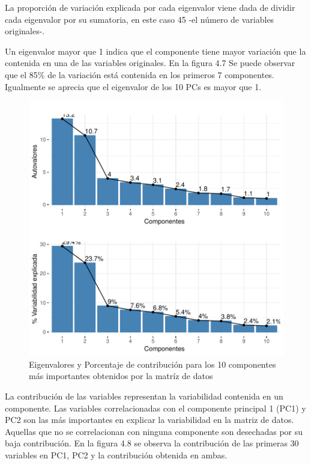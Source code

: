 \documentclass[a4paper,12pt]{Latex/Classes/PhDthesisPSnPDF}
\begin{document}
La proporción de variación explicada por cada eigenvalor viene dada de dividir cada eigenvalor por su sumatoria, en este caso 45 -el número de variables originales-.

Un eigenvalor mayor que 1 indica que el componente tiene mayor variación que la contenida en una de las variables originales. En la figura 4.7 Se puede observar que el 85\% de la variación está contenida en los primeros 7 componentes. Igualmente se aprecia que el eigenvalor de los 10 PCs es mayor que 1. 

\begin{figure}[H]
\centering
\includegraphics{main-013}
\caption{Eigenvalores y Porcentaje de contribución para los 10 componentes más importantes obtenidos por la matríz de datos}
\end{figure}

La contribución de las variables representan la variabilidad contenida en un componente. Las variables correlacionadas con el componente principal 1 (PC1) y PC2 son las más importantes en explicar la variabilidad en la matriz de datos. Aquellas que no se correlacionan con ninguna componente son desechadas por su baja contribución. En la figura 4.8 se observa la contribución de las primeras 30 variables en PC1, PC2 y la contribución obtenida en ambas.
\end{document}
